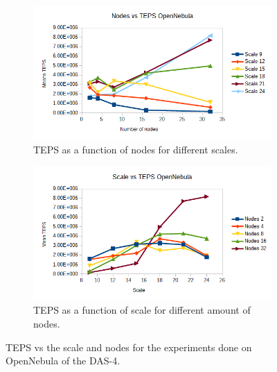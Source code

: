 \begin{figure}[!h]
\centering
\begin{subfigure}{.5\textwidth}
  \centering
  \includegraphics[width=\linewidth]{images/nodes_opennebula.png}
  \caption{TEPS as a function of nodes for different scales.}
  \label{fig:nodes_opennebula}
\end{subfigure}%
\begin{subfigure}{.5\textwidth}
  \centering
  \includegraphics[width=\linewidth]{images/scale_opennebula.png}
  \caption{TEPS as a function of scale for different amount of nodes.}
  \label{fig:scale_opennebula}
\end{subfigure}
\caption{TEPS vs the scale and nodes for the experiments done on OpenNebula of the DAS-4. }
\label{fig:das_opennebula}
\end{figure}

